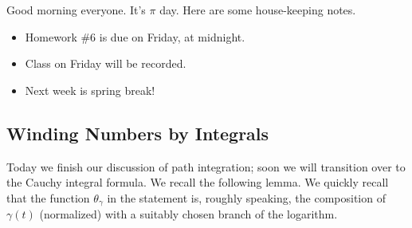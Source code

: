 
Good morning everyone. It's $\pi$ day. Here are some house-keeping notes.
\begin{itemize}
	\item Homework \#6 is due on Friday, at midnight.
	\item Class on Friday will be recorded.
	\item Next week is spring break!
\end{itemize}

\subsection{Winding Numbers by Integrals}
Today we finish our discussion of path integration; soon we will transition over to the Cauchy integral formula. We recall the following lemma.
\windingnumber*
\noindent We quickly recall that the function $\theta_\gamma$ in the statement is, roughly speaking, the composition of $\gamma(t)$ (normalized) with a suitably chosen branch of the logarithm.

